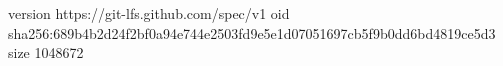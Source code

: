 version https://git-lfs.github.com/spec/v1
oid sha256:689b4b2d24f2bf0a94e744e2503fd9e5e1d07051697cb5f9b0dd6bd4819ce5d3
size 1048672
